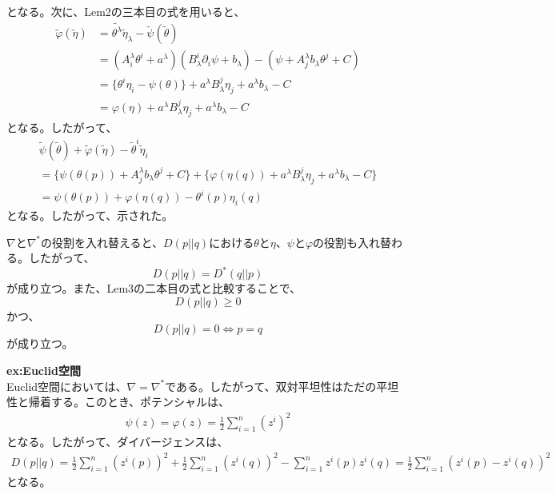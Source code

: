 \documentclass[a4paper,11pt]{jsarticle}
\numberwithin{equation}{section}
\begin{document}
となる。次に、Lem2の三本目の式を用いると、
\begin{align}
    \tilde{\varphi}(\tilde{\eta}) &= \tilde{\theta^\lambda} \tilde{\eta}_\lambda - \tilde{\psi}(\tilde{\theta})\\
    &= (A_i^\lambda \theta^i + a^\lambda) (B^i_\lambda \partial_i \psi + b_\lambda) - (\psi + A^\lambda_j b_\lambda \theta^j +C)\\
    &= \{\theta^i \eta_i - \psi(\theta)\} + a^\lambda B^j_\lambda \eta_j +a^\lambda b_\lambda -C\\
    &= \varphi(\eta) + a^\lambda B_\lambda^j \eta_j + a^\lambda b_\lambda -C
\end{align}
となる。したがって、
\begin{align}
    \tilde{\psi}(\tilde{\theta}) + \tilde{\varphi}(\tilde{\eta}) - \tilde{\theta}^i \tilde{\eta}_i\\
    = \{\psi(\theta(p)) + A^\lambda_j b_\lambda \theta^j +C\} + \{\varphi(\eta(q)) + a^\lambda B_\lambda^j \eta_j + a^\lambda b_\lambda -C\} \\
    = \psi(\theta(p)) + \varphi(\eta(q)) - \theta^i(p)\eta_i(q)
\end{align}
となる。したがって、示された。\hfill\qedsymbol

$\nabla$と$\nabla^*$の役割を入れ替えると、$D(p||q)$における$\theta$と$\eta$、$\psi$と$\varphi$の役割も入れ替わる。したがって、
\begin{equation}
    D(p||q) = D^*(q||p)
\end{equation}
が成り立つ。また、Lem3の二本目の式と比較することで、
\begin{equation}
    D(p||q) \geq 0
\end{equation}
かつ、
\begin{equation}
    D(p||q) = 0 \Leftrightarrow p = q
\end{equation}
が成り立つ。

\textbf{ex:Euclid空間}\\
Euclid空間においては、$\nabla = \nabla^*$である。したがって、双対平坦性はただの平坦性と帰着する。このとき、ポテンシャルは、
\begin{align}
    \psi(z) = \varphi(z) = \frac{1}{2}\sum_{i=1}^{n} (z^i)^2
\end{align}
となる。したがって、ダイバージェンスは、
\begin{align}
    D(p||q) = \frac{1}{2}\sum_{i=1}^{n} (z^i(p))^2 + \frac{1}{2}\sum_{i=1}^{n} (z^i(q))^2 - \sum_{i=1}^{n} z^i(p)z^i(q) = \frac{1}{2}\sum_{i=1}^{n} (z^i(p) - z^i(q))^2
\end{align}
となる。
\end{document}
